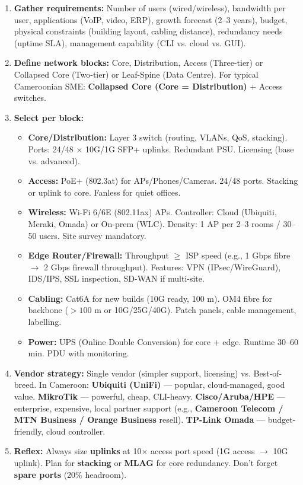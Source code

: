 \documentclass[11pt]{article}
\begin{document}
\begin{methode}
\begin{enumerate}
\item \textbf{Gather requirements:} Number of users (wired/wireless), bandwidth per user, applications (VoIP, video, ERP), growth forecast (2–3 years), budget, physical constraints (building layout, cabling distance), redundancy needs (uptime SLA), management capability (CLI vs. cloud vs. GUI).
\item \textbf{Define network blocks:} Core, Distribution, Access (Three-tier) or Collapsed Core (Two-tier) or Leaf-Spine (Data Centre). For typical Cameroonian SME: \textbf{Collapsed Core (Core = Distribution)} + Access switches.
\item \textbf{Select per block:}
      \begin{itemize}
      \item \textbf{Core/Distribution:} Layer 3 switch (routing, VLANs, QoS, stacking). Ports: 24/48 × 10G/1G SFP+ uplinks. Redundant PSU. Licensing (base vs. advanced).
      \item \textbf{Access:} PoE+ (802.3at) for APs/Phones/Cameras. 24/48 ports. Stacking or uplink to core. Fanless for quiet offices.
      \item \textbf{Wireless:} Wi-Fi 6/6E (802.11ax) APs. Controller: Cloud (Ubiquiti, Meraki, Omada) or On-prem (WLC). Density: 1 AP per 2–3 rooms / 30–50 users. Site survey mandatory.
      \item \textbf{Edge Router/Firewall:} Throughput $\geq$ ISP speed (e.g., 1 Gbps fibre $\rightarrow$ 2 Gbps firewall throughput). Features: VPN (IPsec/WireGuard), IDS/IPS, SSL inspection, SD-WAN if multi-site.
      \item \textbf{Cabling:} Cat6A for new builds (10G ready, 100 m). OM4 fibre for backbone ($>100$ m or 10G/25G/40G). Patch panels, cable management, labelling.
      \item \textbf{Power:} UPS (Online Double Conversion) for core + edge. Runtime 30–60 min. PDU with monitoring.
      \end{itemize}
\item \textbf{Vendor strategy:} Single vendor (simpler support, licensing) vs. Best-of-breed. In Cameroon: \textbf{Ubiquiti (UniFi)} — popular, cloud-managed, good value. \textbf{MikroTik} — powerful, cheap, CLI-heavy. \textbf{Cisco/Aruba/HPE} — enterprise, expensive, local partner support (e.g., \textbf{Cameroon Telecom / MTN Business / Orange Business} resell). \textbf{TP-Link Omada} — budget-friendly, cloud controller.
\item \textbf{Reflex:} Always size \textbf{uplinks} at 10× access port speed (1G access $\rightarrow$ 10G uplink). Plan for \textbf{stacking} or \textbf{MLAG} for core redundancy. Don't forget \textbf{spare ports} (20\% headroom).
\end{enumerate}
\end{methode}
\end{document}
